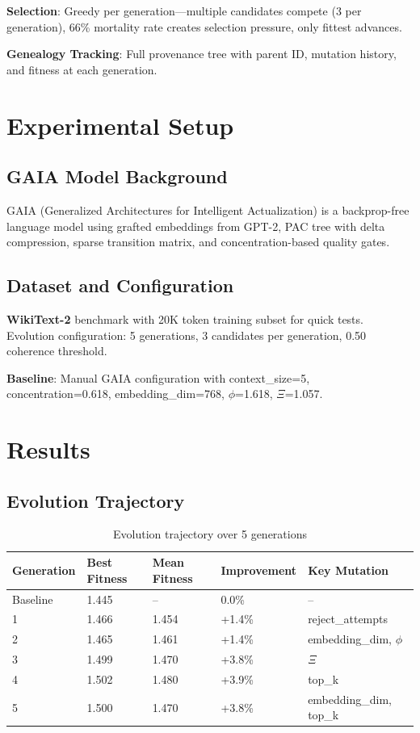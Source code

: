 \documentclass[11pt,a4paper]{article}
\begin{document}
\textbf{Selection}: Greedy per generation---multiple candidates compete (3 per generation), 66\% mortality rate creates selection pressure, only fittest advances.

\textbf{Genealogy Tracking}: Full provenance tree with parent ID, mutation history, and fitness at each generation.

\section{Experimental Setup}

\subsection{GAIA Model Background}

GAIA (Generalized Architectures for Intelligent Actualization) is a backprop-free language model using grafted embeddings from GPT-2, PAC tree with delta compression, sparse transition matrix, and concentration-based quality gates.

\subsection{Dataset and Configuration}

\textbf{WikiText-2} benchmark with 20K token training subset for quick tests. Evolution configuration: 5 generations, 3 candidates per generation, 0.50 coherence threshold.

\textbf{Baseline}: Manual GAIA configuration with context\_size=5, concentration=0.618, embedding\_dim=768, $\phi$=1.618, $\Xi$=1.057.

\section{Results}

\subsection{Evolution Trajectory}

\begin{table}[H]
\centering
\begin{tabular}{lllll}
\toprule
\textbf{Generation} & \textbf{Best Fitness} & \textbf{Mean Fitness} & \textbf{Improvement} & \textbf{Key Mutation} \\
\midrule
Baseline & 1.445 & -- & 0.0\% & -- \\
1 & 1.466 & 1.454 & +1.4\% & reject\_attempts \\
2 & 1.465 & 1.461 & +1.4\% & embedding\_dim, $\phi$ \\
3 & 1.499 & 1.470 & +3.8\% & $\Xi$ \\
4 & 1.502 & 1.480 & +3.9\% & top\_k \\
5 & 1.500 & 1.470 & +3.8\% & embedding\_dim, top\_k \\
\bottomrule
\end{tabular}
\caption{Evolution trajectory over 5 generations}
\end{table}
\end{document}
